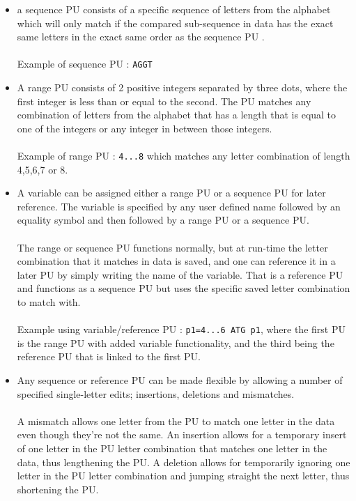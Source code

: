 \documentclass[12pt]{article}
\newcommand{\pu}{PU }
\newcommand{\pup}{PU. }
\begin{document}
\begin{itemize}
\item a sequence \pu consists of a specific sequence of letters from the alphabet which will
only match if the compared sub-sequence in data has the exact same letters in the exact same order as the 
sequence \pu. \\ \\
Example of sequence \pu : \texttt{AGGT}
\item A range \pu consists of 2 positive integers separated by three dots, where the first integer is less than or
equal to the second. The \pu matches any combination of
letters from the alphabet that has a length that is equal to one of the integers or any integer in between those integers. \\ \\
Example of range \pu : \texttt{4...8} which matches any letter combination of length 4,5,6,7 or 8.
\item A variable can be assigned either a range \pu or a sequence \pu for later reference. The variable is specified by 
any user defined name
followed by an equality symbol and then followed by a range \pu or a sequence \pup \\ \\
The range or sequence PU functions normally, but at run-time the letter combination that it matches
in data is saved, and one can reference it in a later \pu by simply writing the name of the variable. That is a
reference \pu and functions as a sequence \pu but uses the specific saved 
letter combination to match with. \\ \\
Example using variable/reference \pu : \texttt{p1=4...6\; ATG\; p1}, where
the first \pu is the range \pu with added variable functionality, 
and the third being the reference \pu that is linked to the first \pup
\item Any sequence or reference \pu can be made flexible by allowing a number of specified
single-letter edits; insertions, deletions and mismatches. \\ \\
A mismatch allows one letter from the \pu to match one letter in the data even though they're not the same.
An insertion allows for a temporary insert of one letter in the \pu letter combination that matches one letter in
the data, thus lengthening the \pup A deletion allows for temporarily ignoring one letter in the \pu letter combination
and jumping straight the next letter, thus shortening the \pup \\

\end{itemize}
\end{document}
